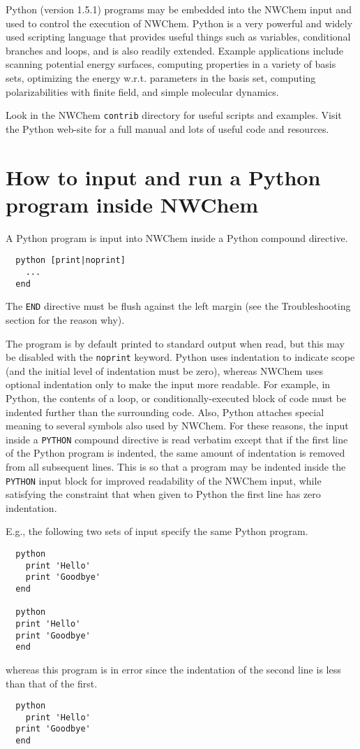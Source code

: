 %
%
\label{sec:python}

Python (version 1.5.1) programs may be embedded into the NWChem input
and used to control the execution of NWChem.  Python is a very
powerful and widely used scripting language that provides useful
things such as variables, conditional branches and loops, and is also
readily extended.  Example applications include scanning potential
energy surfaces, computing properties in a variety of basis sets,
optimizing the energy w.r.t. parameters in the basis set, computing
polarizabilities with finite field, and simple molecular dynamics.

Look in the NWChem \verb+contrib+ directory for useful scripts and
examples. Visit the Python web-site 
for a full manual and lots of useful code and resources.  

\section{How to input and run a Python program inside NWChem}

A Python program is input into NWChem inside a Python compound directive.
\begin{verbatim}
  python [print|noprint]
    ...
  end
\end{verbatim}
The \verb+END+ directive must be flush against the left
margin (see the Troubleshooting section for the reason why).

The program is by default printed to standard output when read, but
this may be disabled with the \verb+noprint+ keyword.  Python uses
indentation to indicate scope (and the initial level of indentation
must be zero), whereas NWChem uses optional indentation only to make
the input more readable.  For example, in Python, the contents of a
loop, or conditionally-executed block of code must be indented further
than the surrounding code.  Also, Python attaches special meaning to
several symbols also used by NWChem.  For these reasons, the input
inside a \verb+PYTHON+ compound directive is read verbatim except that
if the first line of the Python program is indented, the same amount
of indentation is removed from all subsequent lines.  This is so that
a program may be indented inside the \verb+PYTHON+ input block for
improved readability of the NWChem input, while satisfying the
constraint that when given to Python the first line has zero
indentation.

E.g., the following two sets of input specify the same Python program.
\begin{verbatim}
  python
    print 'Hello'
    print 'Goodbye'
  end

  python
  print 'Hello'
  print 'Goodbye'
  end
\end{verbatim}
whereas this program is in error since the indentation of the second
line is less than that of the first.
\begin{verbatim}
  python
    print 'Hello'
  print 'Goodbye'
  end
\end{verbatim}

